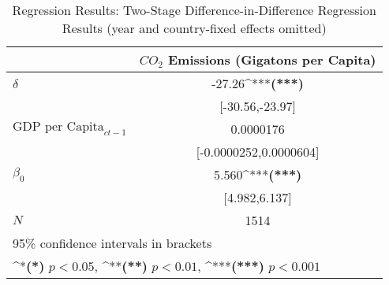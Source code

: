 \newcommand{\sym}[1]{\ifmmode^{#1}\else\textbf{(#1)}\fi}
\begin{center}
    \begin{table}
    \caption{Regression Results: Two-Stage Difference-in-Difference Regression Results (year and country-fixed effects omitted)}
    \begin{tabular}{l*{1}{c}}
    \hline\hline
                &\multicolumn{1}{c}{$CO_2$ Emissions (Gigatons per Capita)} \\
    \hline
    $\delta$&                -27.26\sym{***}\\
                &       [-30.56,-23.97]         \\
    [1em]
    $\text{GDP per Capita}_{ct-1}$&             0.0000176         \\
                &[-0.0000252,0.0000604]         \\
    [1em]
    $\beta_0$      &                 5.560\sym{***}\\
                &         [4.982,6.137]         \\
    \hline
    \(N\)       &                  1514         \\
    \hline\hline
    \multicolumn{2}{l}{\footnotesize 95\% confidence intervals in brackets}\\
    \multicolumn{2}{l}{\footnotesize \sym{*} \(p<0.05\), \sym{**} \(p<0.01\), \sym{***} \(p<0.001\)}\\    
    \end{tabular}
    \end{table}
    \label{tab:regression_results}
\end{center}